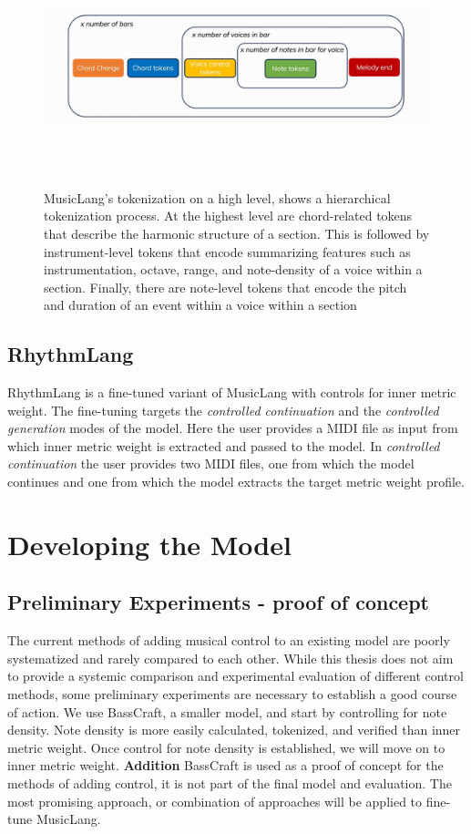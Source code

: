 \begin{figure}[H]
    \centering
    \includegraphics[width=1\textwidth]{IMAGES/MusicLang.JPG} 
    \caption{MusicLang's tokenization on a high level, shows a hierarchical tokenization process. At the highest level are chord-related tokens that describe the harmonic structure of a section. This is followed by instrument-level tokens that encode summarizing features such as instrumentation, octave, range, and note-density of a voice within a section. Finally, there are note-level tokens that encode the pitch and duration of an event within a voice within a section}
    \label{fig:musiclangtok}
\end{figure}

\subsection{RhythmLang}
RhythmLang is a fine-tuned variant of MusicLang with controls for inner metric weight. The fine-tuning targets the \textit{controlled continuation} and the \textit{controlled generation} modes of the model. Here the user provides a MIDI file as input from which inner metric weight is extracted and passed to the model. In \textit{controlled continuation} the user provides two MIDI files, one from which the model continues and one from which the model extracts the target metric weight profile. 
\section{Developing the Model}


\subsection{Preliminary Experiments - proof of concept}
The current methods of adding musical control to an existing model are poorly systematized and rarely compared to each other. While this thesis does not aim to provide a systemic comparison and experimental evaluation of different control methods, some preliminary experiments are necessary to establish a good course of action. We use BassCraft, a smaller model, and start by controlling for note density. Note density is more easily calculated, tokenized, and verified than inner metric weight. Once control for note density is established, we will move on to inner metric weight. \textbf{Addition} BassCraft is used as a proof of concept for the methods of adding control, it is not part of the final model and evaluation. The most promising approach, or combination of approaches will be applied to fine-tune MusicLang. 

